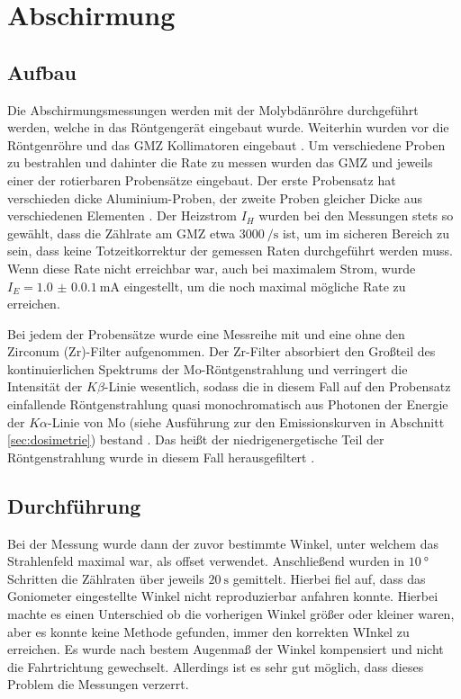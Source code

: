 \chapter{Abschirmung}
\section{Aufbau}

Die Abschirmungsmessungen werden mit der Molybdänröhre durchgeführt werden, welche in das Röntgengerät eingebaut wurde. Weiterhin wurden vor die Röntgenröhre und das GMZ Kollimatoren eingebaut \cite[6]{529va}.
Um verschiedene Proben zu bestrahlen und dahinter die Rate zu messen wurden das GMZ und jeweils einer der rotierbaren Probensätze eingebaut.
Der erste Probensatz hat verschieden dicke Aluminium-Proben, der zweite Proben gleicher Dicke aus verschiedenen Elementen \cite[6]{529va}.
Der Heizstrom $I_H$ wurden bei den Messungen stets so gewählt, dass die Zählrate am GMZ etwa $\SI{3000}{\per\second}$ ist, um im sicheren Bereich zu sein, dass keine Totzeitkorrektur der gemessen Raten durchgeführt werden muss. Wenn diese Rate nicht erreichbar war, auch bei maximalem Strom, wurde $I_E=\SI{1.0(0.01)}{\milli\A}$ eingestellt, um die noch maximal mögliche Rate zu erreichen.

Bei jedem der Probensätze wurde eine Messreihe mit und eine ohne den Zirconum (Zr)-Filter aufgenommen. Der Zr-Filter absorbiert den Großteil des kontinuierlichen Spektrums der Mo-Röntgenstrahlung und verringert die Intensität der $K\beta$-Linie wesentlich, sodass die in diesem Fall auf den Probensatz einfallende Röntgenstrahlung quasi monochromatisch aus Photonen der Energie der $K\alpha$-Linie von Mo (siehe Ausführung zur den Emissionskurven in Abschnitt \ref{sec:dosimetrie}) bestand \cite{zrfilter}. Das heißt der niedrigenergetische Teil der Röntgenstrahlung wurde in diesem Fall herausgefiltert \cite[2]{LDabschwaechung}.


\section{Durchführung}

Bei der Messung wurde dann der zuvor bestimmte Winkel, unter welchem das Strahlenfeld maximal war, als offset verwendet. Anschließend wurden in $\SI{10}{\degree}$ Schritten die Zählraten über jeweils $\SI{20}{\second}$ gemittelt. Hierbei fiel auf, dass das Goniometer eingestellte Winkel nicht reproduzierbar anfahren konnte. Hierbei machte es einen Unterschied ob die vorherigen Winkel größer oder kleiner waren, aber es konnte keine Methode gefunden, immer den korrekten WInkel zu erreichen. Es wurde nach bestem Augenmaß der Winkel kompensiert und nicht die Fahrtrichtung gewechselt. Allerdings ist es sehr gut möglich, dass dieses Problem die Messungen verzerrt.


